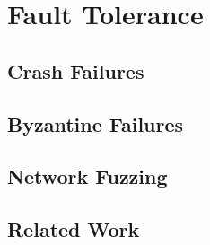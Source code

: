\chapter{Fault Tolerance}

\section{Crash Failures}

\section{Byzantine Failures}

\section{Network Fuzzing}

\section{Related Work}

